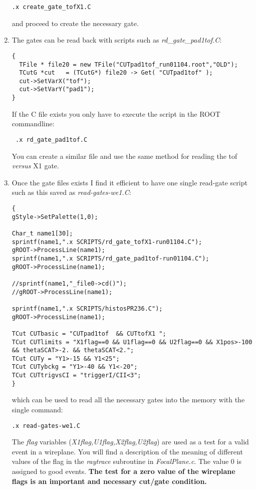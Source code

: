 \documentclass[11pt]{report}
\begin{document}
\begin{enumerate}
\begin{verbatim}
.x create_gate_tofX1.C
\end{verbatim}

and proceed to create the necessary gate.


\item The gates can be read back with scripts such as {\it rd\_gate\_pad1tof.C}:
\begin{verbatim}
{
  TFile * file20 = new TFile("CUTpad1tof_run01104.root","OLD");
  TCutG *cut   = (TCutG*) file20 -> Get( "CUTpad1tof" );
  cut->SetVarX("tof");
  cut->SetVarY("pad1");
}
\end{verbatim}
If the C file exists you only have to execute the script in the ROOT commandline:
\begin{verbatim} .x rd_gate_pad1tof.C  \end{verbatim}
You can create a similar file and use the same method for reading the tof {\it versus} X1 gate.


\item Once the gate files exists I find it efficient to have one single read-gate
script such as this saved as {\it read-gates-we1.C}:
\begin{verbatim}
{
gStyle->SetPalette(1,0);

Char_t name1[30];
sprintf(name1,".x SCRIPTS/rd_gate_tofX1-run01104.C");
gROOT->ProcessLine(name1);
sprintf(name1,".x SCRIPTS/rd_gate_pad1tof-run01104.C");
gROOT->ProcessLine(name1);

//sprintf(name1,"_file0->cd()");
//gROOT->ProcessLine(name1);

sprintf(name1,".x SCRIPTS/histosPR236.C");
gROOT->ProcessLine(name1);

TCut CUTbasic = "CUTpad1tof  && CUTtofX1 ";
TCut CUTlimits = "X1flag==0 && U1flag==0 && U2flag==0 && X1pos>-100 && thetaSCAT>-2. && thetaSCAT<2.";
TCut CUTy = "Y1>-15 && Y1<25";      
TCut CUTybckg = "Y1>-40 && Y1<-20";      
TCut CUTtrigvsCI = "triggerI/CII<3";
}
\end{verbatim}

which can be used to read all the necessary gates into the memory with the single command:

\begin{verbatim}
.x read-gates-we1.C
\end{verbatim}

The {\it flag} variables ({\it X1flag,U1flag,X2flag,U2flag}) are used as a test for a valid event in a wireplane.
You will find a description of the meaning of different values of the flag in the {\it raytrace} subroutine 
in {\it FocalPlane.c}. The value 0 is assigned to good events.
{\bf The test for a zero value of the wireplane flags is an important and necessary cut/gate condition.}



\end{enumerate}
\end{document}
